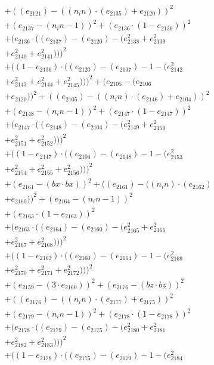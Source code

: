 \documentclass[10pt, a4paper]{article}
\begin{document}
\begin{align*}
& + ((e_{2121}) - ((n_in)  \cdot  (e_{2135}) + e_{2120}))^{2} \\
& + (e_{2137} - (n_in - 1))^{2} + (e_{2136}  \cdot  (1 - e_{2136}))^{2} \\
& + (e_{2136}  \cdot  ((e_{2137}) - (e_{2120}) - (e_{2138}^{2} + e_{2139}^{2} \\
& + e_{2140}^{2} + e_{2141}^{2})))^{2} \\
& + ((1 - e_{2136})  \cdot  ((e_{2120}) - (e_{2137}) - 1 - (e_{2142}^{2} \\
& + e_{2143}^{2} + e_{2144}^{2} + e_{2145}^{2})))^{2} + (e_{2105} - (e_{2106} \\
& + e_{2120}))^{2} + ((e_{2105}) - ((n_in)  \cdot  (e_{2146}) + e_{2104}))^{2} \\
& + (e_{2148} - (n_in - 1))^{2} + (e_{2147}  \cdot  (1 - e_{2147}))^{2} \\
& + (e_{2147}  \cdot  ((e_{2148}) - (e_{2104}) - (e_{2149}^{2} + e_{2150}^{2} \\
& + e_{2151}^{2} + e_{2152}^{2})))^{2} \\
& + ((1 - e_{2147})  \cdot  ((e_{2104}) - (e_{2148}) - 1 - (e_{2153}^{2} \\
& + e_{2154}^{2} + e_{2155}^{2} + e_{2156}^{2})))^{2} \\
& + (e_{2161} - (bx  \cdot  bx))^{2} + ((e_{2161}) - ((n_in)  \cdot  (e_{2162}) \\
& + e_{2160}))^{2} + (e_{2164} - (n_in - 1))^{2} \\
& + (e_{2163}  \cdot  (1 - e_{2163}))^{2} \\
& + (e_{2163}  \cdot  ((e_{2164}) - (e_{2160}) - (e_{2165}^{2} + e_{2166}^{2} \\
& + e_{2167}^{2} + e_{2168}^{2})))^{2} \\
& + ((1 - e_{2163})  \cdot  ((e_{2160}) - (e_{2164}) - 1 - (e_{2169}^{2} \\
& + e_{2170}^{2} + e_{2171}^{2} + e_{2172}^{2})))^{2} \\
& + (e_{2159} - (3  \cdot  e_{2160}))^{2} + (e_{2176} - (bz  \cdot  bz))^{2} \\
& + ((e_{2176}) - ((n_in)  \cdot  (e_{2177}) + e_{2175}))^{2} \\
& + (e_{2179} - (n_in - 1))^{2} + (e_{2178}  \cdot  (1 - e_{2178}))^{2} \\
& + (e_{2178}  \cdot  ((e_{2179}) - (e_{2175}) - (e_{2180}^{2} + e_{2181}^{2} \\
& + e_{2182}^{2} + e_{2183}^{2})))^{2} \\
& + ((1 - e_{2178})  \cdot  ((e_{2175}) - (e_{2179}) - 1 - (e_{2184}^{2} \\

\end{align*}
\end{document}
